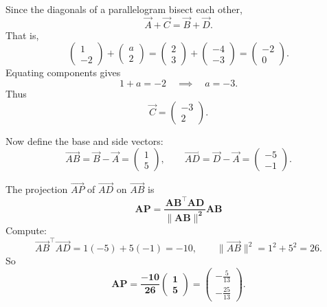 \documentclass[journal]{IEEEtran}
\begin{document}
Since the diagonals of a parallelogram bisect each other,
\begin{equation}
\vec A+\vec C = \vec B+\vec D.
\end{equation}
That is,
\begin{equation}
\begin{pmatrix}1\\-2\end{pmatrix}+\begin{pmatrix}a\\2\end{pmatrix}
=\begin{pmatrix}2\\3\end{pmatrix}+\begin{pmatrix}-4\\-3\end{pmatrix}
=\begin{pmatrix}-2\\0\end{pmatrix}.
\end{equation}
Equating components gives
\begin{equation}
1+a=-2 \quad \implies \quad a=-3.
\end{equation}
Thus
\begin{equation}
\vec C=\begin{pmatrix}-3\\2\end{pmatrix}.
\end{equation}

Now define the base and side vectors:
\begin{equation}
\vec{AB}=\vec B-\vec A=\begin{pmatrix}1\\5\end{pmatrix}, \qquad
\vec{AD}=\vec D-\vec A=\begin{pmatrix}-5\\-1\end{pmatrix}.
\end{equation}

The projection $\vec{AP}$ of $\vec{AD}$ on $\vec{AB}$ is
\begin{equation}
\mathbf{AP = \frac{AB^\top AD}{\|AB\|^2} AB}
\end{equation}
Compute:
\begin{equation}
\vec{AB}^\top\vec{AD}=1(-5)+5(-1)=-10, \qquad
\|\vec{AB}\|^2=1^2+5^2=26.
\end{equation}
So
\begin{equation}
\mathbf{AP=\frac{-10}{26}\begin{pmatrix}1\\5\end{pmatrix}}
=\begin{pmatrix}-\tfrac{5}{13}\\[4pt]-\tfrac{25}{13}\end{pmatrix}.
\end{equation}
\end{document}
